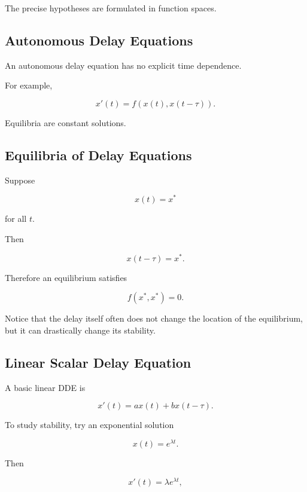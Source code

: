 The precise hypotheses are formulated in function spaces.

\subsection{Autonomous Delay Equations}
\label{subsec:autonomous-delay-equations}

An autonomous delay equation has no explicit time dependence.

For example,

\[
\boxed{
x'(t)
=
f
\left(
x(t),
x(t-\tau)
\right).
}
\]

Equilibria are constant solutions.

\subsection{Equilibria of Delay Equations}
\label{subsec:dde-equilibria}

Suppose

\[
x(t)=x^*
\]

for all \(t\).

Then

\[
x(t-\tau)=x^*.
\]

Therefore an equilibrium satisfies

\[
\boxed{
f(x^*,x^*)=0.
}
\]

Notice that the delay itself often does not change the location of the
equilibrium, but it can drastically change its stability.

\subsection{Linear Scalar Delay Equation}
\label{subsec:linear-scalar-delay-equation}

A basic linear DDE is

\[
\boxed{
x'(t)
=
ax(t)
+
bx(t-\tau).
}
\]

To study stability, try an exponential solution

\[
\boxed{
x(t)=e^{\lambda t}.
}
\]

Then

\[
x'(t)
=
\lambda e^{\lambda t},
\]

